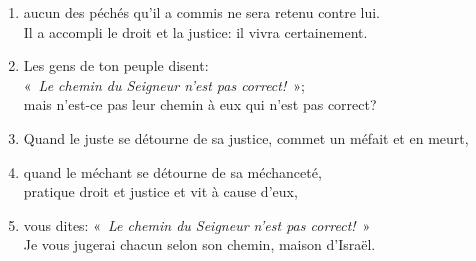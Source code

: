 \begin{enumerate}[leftmargin=\psleftmargin, labelsep = \pslabelsep, label={\arabic*}, font=\color{\pscolor}\small\textsuperscript, parsep=0em, itemsep=0em, topsep=0em ]
    \item aucun des péchés qu’il a commis ne sera retenu contre lui. \\ Il a accompli le droit et la justice: il vivra certainement. \verseSpace
    \item Les gens de ton peuple disent: \\ \decalage «~\textit{Le chemin du Seigneur n’est pas correct!}~»; \\ mais n’est-ce pas leur chemin à eux qui n’est pas correct?
    \item Quand le juste se détourne de sa justice, commet un méfait et en meurt,
    \item quand le méchant se détourne de sa méchanceté, \\ pratique droit et justice et vit à cause d’eux,
    \item vous dites: «~\textit{Le chemin du Seigneur n’est pas correct!}~» \\ Je vous jugerai chacun selon son chemin, maison d’Israël. \newpage

\end{enumerate}
